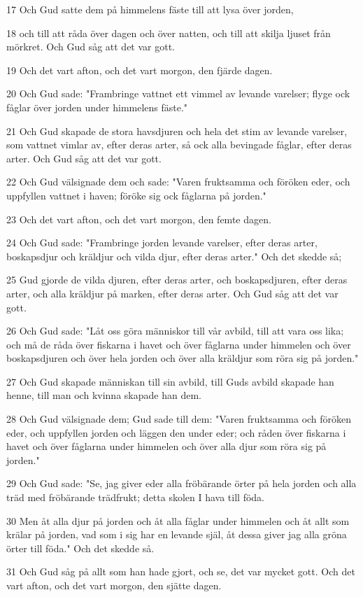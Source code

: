 \par 17 Och Gud satte dem på himmelens fäste till att lysa över jorden,
\par 18 och till att råda över dagen och över natten, och till att skilja ljuset från mörkret. Och Gud såg att det var gott.
\par 19 Och det vart afton, och det vart morgon, den fjärde dagen.
\par 20 Och Gud sade: "Frambringe vattnet ett vimmel av levande varelser; flyge ock fåglar över jorden under himmelens fäste."
\par 21 Och Gud skapade de stora havsdjuren och hela det stim av levande varelser, som vattnet vimlar av, efter deras arter, så ock alla bevingade fåglar, efter deras arter. Och Gud såg att det var gott.
\par 22 Och Gud välsignade dem och sade: "Varen fruktsamma och föröken eder, och uppfyllen vattnet i haven; föröke sig ock fåglarna på jorden."
\par 23 Och det vart afton, och det vart morgon, den femte dagen.
\par 24 Och Gud sade: "Frambringe jorden levande varelser, efter deras arter, boskapsdjur och kräldjur och vilda djur, efter deras arter." Och det skedde så;
\par 25 Gud gjorde de vilda djuren, efter deras arter, och boskapsdjuren, efter deras arter, och alla kräldjur på marken, efter deras arter. Och Gud såg att det var gott.
\par 26 Och Gud sade: "Låt oss göra människor till vår avbild, till att vara oss lika; och må de råda över fiskarna i havet och över fåglarna under himmelen och över boskapsdjuren och över hela jorden och över alla kräldjur som röra sig på jorden."
\par 27 Och Gud skapade människan till sin avbild, till Guds avbild skapade han henne, till man och kvinna skapade han dem.
\par 28 Och Gud välsignade dem; Gud sade till dem: "Varen fruktsamma och föröken eder, och uppfyllen jorden och läggen den under eder; och råden över fiskarna i havet och över fåglarna under himmelen och över alla djur som röra sig på jorden."
\par 29 Och Gud sade: "Se, jag giver eder alla fröbärande örter på hela jorden och alla träd med fröbärande trädfrukt; detta skolen I hava till föda.
\par 30 Men åt alla djur på jorden och åt alla fåglar under himmelen och åt allt som krälar på jorden, vad som i sig har en levande själ, åt dessa giver jag alla gröna örter till föda." Och det skedde så.
\par 31 Och Gud såg på allt som han hade gjort, och se, det var mycket gott. Och det vart afton, och det vart morgon, den sjätte dagen.


